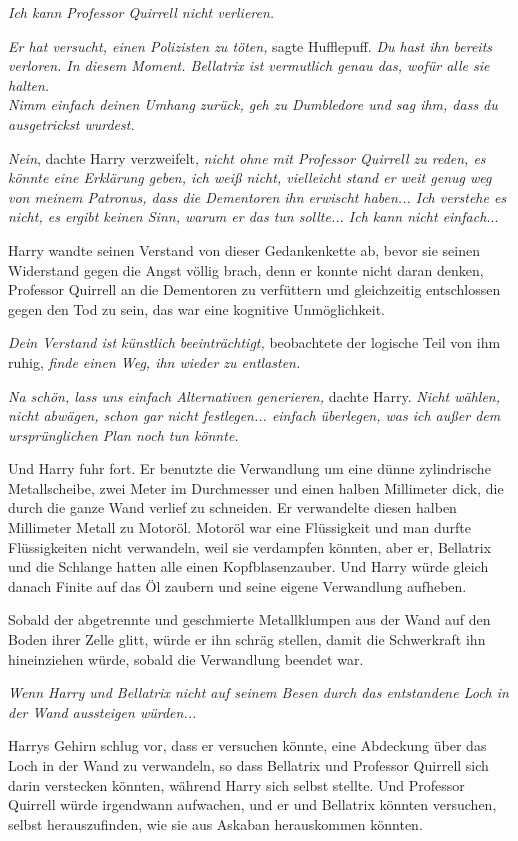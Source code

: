 {\emph{Ich kann Professor Quirrell nicht verlieren.}

\emph{Er hat versucht, einen Polizisten zu töten,} sagte Hufflepuff. \emph{Du hast ihn bereits verloren. In diesem Moment. Bellatrix ist vermutlich genau das, wofür alle sie halten.\\ Nimm einfach deinen Umhang zurück, geh zu Dumbledore und sag ihm, dass du ausgetrickst wurdest.}

\emph{Nein}, dachte Harry verzweifelt, \emph{nicht ohne mit Professor Quirrell zu reden, es könnte eine Erklärung geben, ich weiß nicht, vielleicht stand er weit genug weg von meinem Patronus, dass die Dementoren ihn erwischt haben... Ich verstehe es nicht, es ergibt keinen Sinn, warum er das tun sollte... Ich kann nicht einfach.}..

Harry wandte seinen Verstand von dieser Gedankenkette ab, bevor sie seinen Widerstand gegen die Angst völlig brach, denn er konnte nicht daran denken, Professor Quirrell an die Dementoren zu verfüttern und gleichzeitig entschlossen gegen den Tod zu sein, das war eine kognitive Unmöglichkeit.

\emph{Dein Verstand ist künstlich beeinträchtigt,} beobachtete der logische Teil von ihm ruhig, \emph{finde einen Weg, ihn wieder zu entlasten.}

\emph{Na schön, lass uns einfach Alternativen generieren,} dachte Harry. \emph{Nicht wählen, nicht abwägen, schon gar nicht festlegen... einfach überlegen, was ich außer dem ursprünglichen Plan noch tun könnte.}

Und Harry fuhr fort. Er benutzte die Verwandlung um eine dünne zylindrische Metallscheibe, zwei Meter im Durchmesser und einen halben Millimeter dick, die durch die ganze Wand verlief zu schneiden. Er verwandelte diesen halben Millimeter Metall zu Motoröl. Motoröl war eine Flüssigkeit und man durfte Flüssigkeiten nicht verwandeln, weil sie verdampfen könnten, aber er, Bellatrix und die Schlange hatten alle einen Kopfblasenzauber. Und Harry würde gleich danach Finite auf das Öl zaubern und seine eigene Verwandlung aufheben.

Sobald der abgetrennte und geschmierte Metallklumpen aus der Wand auf den Boden ihrer Zelle glitt, würde er ihn schräg stellen, damit die Schwerkraft ihn hineinziehen würde, sobald die Verwandlung beendet war.

\emph{Wenn Harry und Bellatrix nicht auf seinem Besen durch das entstandene Loch in der Wand aussteigen würden...}

Harrys Gehirn schlug vor, dass er versuchen könnte, eine Abdeckung über das Loch in der Wand zu verwandeln, so dass Bellatrix und Professor Quirrell sich darin verstecken könnten, während Harry sich selbst stellte. Und Professor Quirrell würde irgendwann aufwachen, und er und Bellatrix könnten versuchen, selbst herauszufinden, wie sie aus Askaban herauskommen könnten.

}
